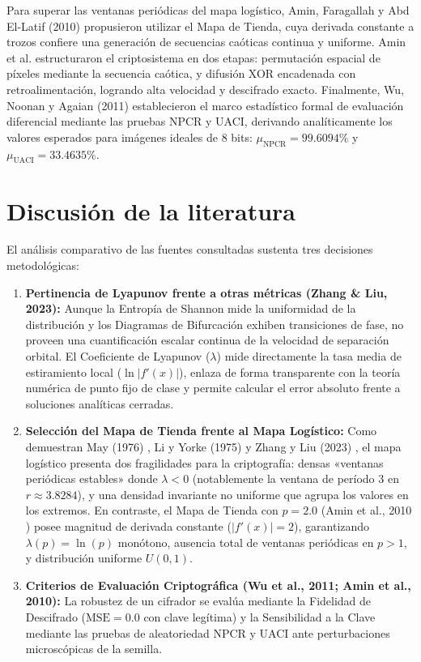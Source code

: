\documentclass[11pt,letterpaper]{article}
\begin{document}
Para superar las ventanas periódicas del mapa logístico, Amin, Faragallah y Abd El-Latif (2010) \cite{amin2010} propusieron utilizar el Mapa de Tienda, cuya derivada constante a trozos confiere una generación de secuencias caóticas continua y uniforme. Amin et al. estructuraron el criptosistema en dos etapas: permutación espacial de píxeles mediante la secuencia caótica, y difusión XOR encadenada con retroalimentación, logrando alta velocidad y descifrado exacto. Finalmente, Wu, Noonan y Agaian (2011) \cite{wu2011} establecieron el marco estadístico formal de evaluación diferencial mediante las pruebas NPCR y UACI, derivando analíticamente los valores esperados para imágenes ideales de 8 bits: $\mu_{\text{NPCR}} = 99.6094\%$ y $\mu_{\text{UACI}} = 33.4635\%$.

\section{Discusión de la literatura}
El análisis comparativo de las fuentes consultadas sustenta tres decisiones metodológicas:

\begin{enumerate}
    \item \textbf{Pertinencia de Lyapunov frente a otras métricas (Zhang \& Liu, 2023):} Aunque la Entropía de Shannon mide la uniformidad de la distribución y los Diagramas de Bifurcación exhiben transiciones de fase, no proveen una cuantificación escalar continua de la velocidad de separación orbital. El Coeficiente de Lyapunov ($\lambda$) mide directamente la tasa media de estiramiento local ($\ln|f'(x)|$), enlaza de forma transparente con la teoría numérica de punto fijo de clase y permite calcular el error absoluto frente a soluciones analíticas cerradas.
    \item \textbf{Selección del Mapa de Tienda frente al Mapa Logístico:} Como demuestran May (1976) \cite{may1976}, Li y Yorke (1975) \cite{li1975} y Zhang y Liu (2023) \cite{zhang2023}, el mapa logístico presenta dos fragilidades para la criptografía: densas «ventanas periódicas estables» donde $\lambda < 0$ (notablemente la ventana de período 3 en $r \approx 3.8284$), y una densidad invariante no uniforme que agrupa los valores en los extremos. En contraste, el Mapa de Tienda con $p=2.0$ (Amin et al., 2010 \cite{amin2010}) posee magnitud de derivada constante ($|f'(x)| = 2$), garantizando $\lambda(p) = \ln(p)$ monótono, ausencia total de ventanas periódicas en $p > 1$, y distribución uniforme $U(0, 1)$.
    \item \textbf{Criterios de Evaluación Criptográfica (Wu et al., 2011; Amin et al., 2010):} La robustez de un cifrador se evalúa mediante la Fidelidad de Descifrado ($\text{MSE} = 0.0$ con clave legítima) y la Sensibilidad a la Clave mediante las pruebas de aleatoriedad NPCR y UACI ante perturbaciones microscópicas de la semilla.
\end{enumerate}
\end{document}
